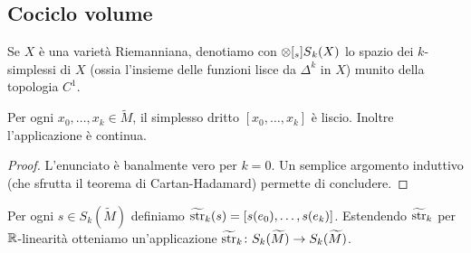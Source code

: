 \subsection{Cociclo volume}
Se $X$ è una varietà Riemanniana, denotiamo con $\prepost[_s]{S}{_k}(X)$ lo spazio dei $k$-simplessi  di $X$ (ossia l'insieme delle funzioni lisce da $\Delta^k$ in $X$) munito della topologia $C^1$.

\begin{proposition}
Per ogni $x_0,\ldots,x_k\in\widetilde M$, il simplesso dritto $[x_0,\ldots,x_k]$ è liscio. Inoltre l'applicazione
è continua.
\end{proposition}
\begin{proof}
L'enunciato è banalmente vero per $k=0$. Un semplice argomento induttivo (che sfrutta il teorema di Cartan-Hadamard) permette di concludere.
\end{proof}

Per ogni $s\in S_k(\widetilde M)$ definiamo $\widetilde{\operatorname{str}}_k(s)=[s(e_0),\ldots,s(e_k)]$. Estendendo $\widetilde{\operatorname{str}}_k$ per $\mathbb{R}$-linearità otteniamo un'applicazione $\map{\tstr_k}{S_k(\widetilde M)}{S_k(\widetilde M)}$.

